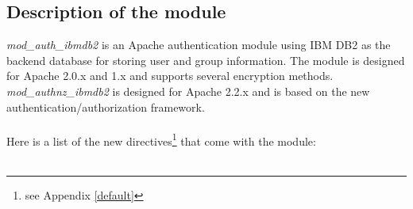 \documentclass[11pt,a4paper]{article}
\begin{document}
\subsection{Description of the module}
\emph{mod\_auth\_ibmdb2} is an Apache authentication module using IBM DB2 as the backend database for storing user and group information. The module is designed for Apache 2.0.x and 1.x and supports several encryption methods.\\
\emph{mod\_authnz\_ibmdb2} is designed for Apache 2.2.x and is based on the new authentication/authorization framework.\\
\\
Here is a list of the new directives\footnote{see Appendix \ref{default}} that come with the module:\\
\\
\small
\end{document}
